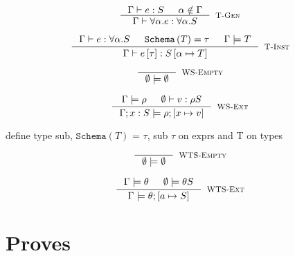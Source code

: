 \documentclass[10pt,a4paper]{article}
\newcommand\highlight[2]{{\setlength\fboxsep{1pt}\colorbox{#1}{#2}}}
\def\NV{\highlight{colorNV}}
\newcommand\ttabs[2]{\ensuremath{\forall #1 . #2}}
\newcommand\etabs[2]{\ensuremath{\forall #1 . #2}}
\newcommand\etapp[2]{\ensuremath{{#1} \left[ {#2}\right]}}
\newcommand\tinst{\rulename{T-Inst}}
\newcommand\tgen{\rulename{T-Gen}}
\newcommand\wsEmp{\rulename{WS-Empty}}
\newcommand\wsExt{\rulename{WS-Ext}}
\newcommand\wsGxt{\rulename{WS-Gxt}}
\newcommand\wstEmp{\rulename{WTS-Empty}}
\newcommand\wstExt{\rulename{WTS-Ext}}
\newcommand\isWellFormed[2]{\ensuremath{{#1}\models {#2}}}
\newcommand\hastype[3]{\ensuremath{{#1}\vdash {#2}:{#3}}}
\newcommand\hastypeEmp[2]{\hastype{\emptyset}{#1}{#2}}
\newcommand\rulename[1]{\textsc{#1}}
\newcommand\sch[1]{\ensuremath{\texttt{Schema}\left(#1\right)}}
\newcommand\sub[2]{\ensuremath{\left[ #1 \mapsto #2 \right]}}
\begin{document}
$$
\inference{
	\hastype{\Gamma}{e}{S} && 
	\alpha \notin \Gamma
}{
	\hastype{\Gamma}{\etabs{\alpha}{e}}{\ttabs{\alpha}{S}}
}[\tgen]
$$

$$
\inference{
	\hastype{\Gamma}{e}{\ttabs{\alpha}{S}} && 
	\sch{T} = \tau && \isWellFormed{\Gamma}{T}
}{
	\hastype{\Gamma}{\etapp{e}{\tau}}{S\sub{\alpha}{T}}
}[\tinst]
$$

\hfill\fbox{\isWellFormed{\Gamma}{\rho}}

$$
\inference{
}{
	\isWellFormed{\emptyset}{\emptyset}
}[\wsEmp]
$$

$$
\inference{
	\isWellFormed{\Gamma}{\rho} && \hastypeEmp{v}{\rho S}
}{
	\isWellFormed{\Gamma; x:S}{\rho ; \sub{x}{v}}
}[\wsExt]
$$



\begin{comment}
$$
\inference{
	\isWellFormed{\Gamma}{\rho} && \evalstar{\rho e}{true}
}{
	\isWellFormed{\Gamma; e}{\rho}
}[\wsGxt]
$$
\end{comment}



\NV{define type sub, \sch{T} = $\tau$, sub $\tau$ on exprs and T on types}\\
\hfill\fbox{\isWellFormed{\Gamma}{\theta}}

$$
\inference{
}{
	\isWellFormed{\emptyset}{\emptyset}
}[\wstEmp]
$$

$$
\inference{
	\isWellFormed{\Gamma}{\theta} && \isWellFormed{\emptyset}{\theta S}
}{
	\isWellFormed{\Gamma}{\theta;\sub{a}{S}}
}[\wstExt]
$$


\section*{Proves}
\end{document}
